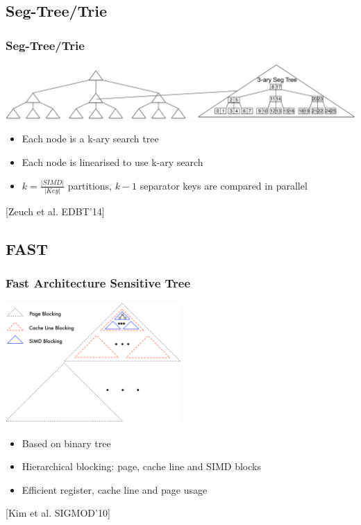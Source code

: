 \documentclass{beamer}
\begin{document}
\subsection{Seg-Tree/Trie}
\begin{frame}
\frametitle{Seg-Tree/Trie}
\begin{center}
\includegraphics[width=1.0\textwidth]{img/SegTree.pdf}
\end{center}
\begin{itemize}[label=\textbullet,leftmargin=1em]
\item Each node is a k-ary search tree
\item Each node is linearised to use k-ary search
\item $k = \frac{\vert SIMD \vert }{\vert Key \vert}$ partitions, $k-1$ separator keys are compared in parallel
\end{itemize}
\vspace*{\fill}
\begin{center}
\tiny [Zeuch et al. EDBT’14]
\end{center}
\end{frame}

\subsection{FAST}
\begin{frame}
\frametitle{Fast Architecture Sensitive Tree}
\begin{center}
\includegraphics[width=0.5\textwidth]{img/fast.pdf}
\end{center}
\begin{itemize}[label=\textbullet,leftmargin=1em]
\item Based on binary tree
\item Hierarchical blocking: page, cache line and SIMD  blocks
\item Efficient register, cache line and page usage
\end{itemize}
\begin{center}
\tiny [Kim et al. SIGMOD’10]
\end{center}
\end{frame}
\end{document}
